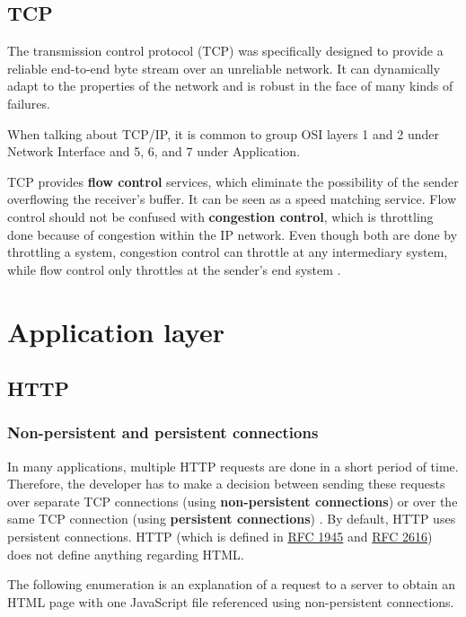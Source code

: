 \subsection{TCP}

The transmission control protocol (TCP) was specifically designed to provide a reliable end-to-end byte stream over an unreliable network.
It can dynamically adapt to the properties of the network and is robust in the face of many kinds of failures.

When talking about TCP/IP, it is common to group OSI layers 1 and 2 under Network Interface and 5, 6, and 7 under Application.

TCP provides \textbf{flow control} services, which eliminate the possibility of the sender overflowing the receiver's buffer. It can be seen as a speed matching service.
Flow control should not be confused with \textbf{congestion control}, which is throttling done because of congestion within the IP network.
Even though both are done by throttling a system, congestion control can throttle at any intermediary system, while flow control only throttles at the sender's end system \cite[p.~250]{computer-networking-kurose-2012}.

\section{Application layer}

\subsection{HTTP}

\subsubsection{Non-persistent and persistent connections}

In many applications, multiple HTTP requests are done in a short period of time.
Therefore, the developer has to make a decision between sending these requests over separate TCP connections (using \textbf{non-persistent connections}) or over the same TCP connection (using \textbf{persistent connections}) \cite[p.~100]{computer-networking-kurose-2012}. By default, HTTP uses persistent connections.
HTTP (which is defined in \href{https://tools.ietf.org/html/rfc1945}{RFC 1945} and \href{https://tools.ietf.org/html/rfc2616}{RFC 2616}) does not define anything regarding HTML.

The following enumeration is an explanation of a request to a server to obtain an HTML page with one JavaScript file referenced using non-persistent connections.

